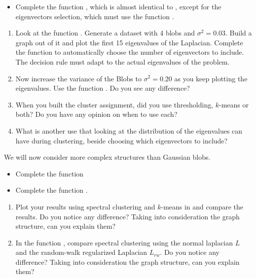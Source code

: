 \documentclass{article}
\begin{document}
\begin{itemize}
	\item Complete the function , which is almost identical to , except for the eigenvectors selection, which must use the function .
\end{itemize}


\begin{enumerate}[resume]
    \item Look at the function .
        Generate a dataset with 4 blobs and
        $\sigma^2=0.03$. Build a graph out of it and plot
        the first 15 eigenvalues of the Laplacian.
        Complete the function 
        to automatically choose the number of eigenvectors to include.
        The decision rule must adapt to the actual eigenvalues of the
        problem.
    \item Now increase the variance of the Blobs to $\sigma^2=0.20$
        as you keep plotting
        the eigenvalues. Use the function .
        Do you see any difference?
    \item When you built the cluster assignment, did you use thresholding,
        $k$-means or both? Do you have any opinion on when to use each?
    \item What is another use that looking at the distribution
        of the eigenvalues can have during clustering, beside
        choosing which eigenvectors to include?
\end{enumerate}

We will now consider more complex structures than Gaussian blobs. 

\begin{itemize}
	\item Complete the function  
	\item Complete the function .
\end{itemize}

\begin{enumerate}[resume]
    \item  Plot your results using spectral
        clustering and $k$-means in  and compare the results.
        Do you notice any difference? Taking into consideration
        the graph structure, can you explain them?
    \item In the function , compare
        spectral clustering using the normal laplacian $L$ and the
        random-walk regularized Laplacian $L_{rw}$.
        Do you notice any difference? Taking into consideration
        the graph structure, can you explain them?
\end{enumerate}
\end{document}

